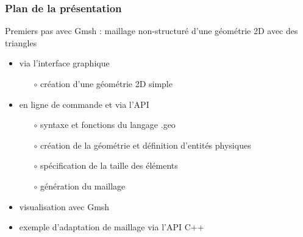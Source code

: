 \documentclass[aspectratio=169]{beamer}
\begin{document}
\begin{frame}[fragile]
\frametitle{Plan de la présentation}
Premiers pas avec Gmsh : maillage non-structuré d'une géométrie 2D avec des triangles
\begin{itemize}
  \item via l'interface graphique
  \begin{itemize}
    \item[$\circ$] création d'une géométrie 2D simple
  \end{itemize}
  \item en ligne de commande et via l'API
  \begin{itemize}
    \item[$\circ$] syntaxe et fonctions du langage .geo
    \item[$\circ$] création de la géométrie et définition d'entités physiques
    \item[$\circ$] spécification de la taille des éléments
    \item[$\circ$] génération du maillage
  \end{itemize}
  \item visualisation avec Gmsh
  \item exemple d'adaptation de maillage via l'API C++
\end{itemize}
\end{frame}

\end{document}
